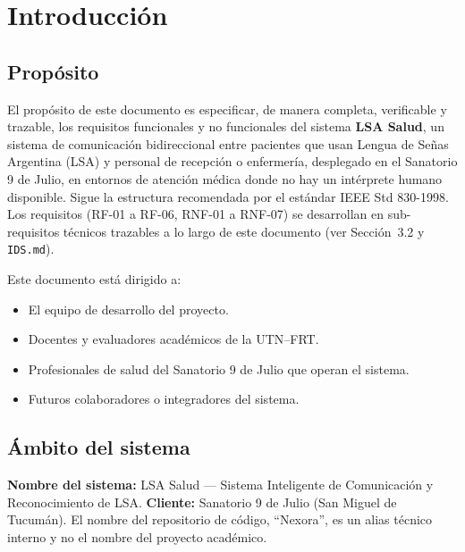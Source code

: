 \section{Introducción}

\subsection{Propósito}

El propósito de este documento es especificar, de manera completa,
verificable y trazable, los requisitos funcionales y no funcionales del
sistema \textbf{LSA Salud}, un sistema de comunicación bidireccional entre
pacientes que usan Lengua de Señas Argentina (LSA) y personal de recepción
o enfermería, desplegado en el Sanatorio 9 de Julio, en entornos de
atención médica donde no hay un intérprete humano disponible. Sigue la
estructura recomendada por el estándar IEEE Std 830-1998. Los requisitos
(RF-01 a RF-06, RNF-01 a RNF-07) se desarrollan en sub-requisitos técnicos
trazables a lo largo de este documento (ver Sección~3.2 y
\texttt{IDS.md}).

Este documento está dirigido a:
\begin{itemize}
    \item El equipo de desarrollo del proyecto.
    \item Docentes y evaluadores académicos de la UTN--FRT.
    \item Profesionales de salud del Sanatorio 9 de Julio que operan el sistema.
    \item Futuros colaboradores o integradores del sistema.
\end{itemize}

\subsection{Ámbito del sistema}

\textbf{Nombre del sistema:} LSA Salud --- Sistema Inteligente de
Comunicación y Reconocimiento de LSA. \textbf{Cliente:} Sanatorio 9 de
Julio (San Miguel de Tucumán). El nombre del repositorio de código,
``Nexora'', es un alias técnico interno y no el nombre del proyecto
académico.

